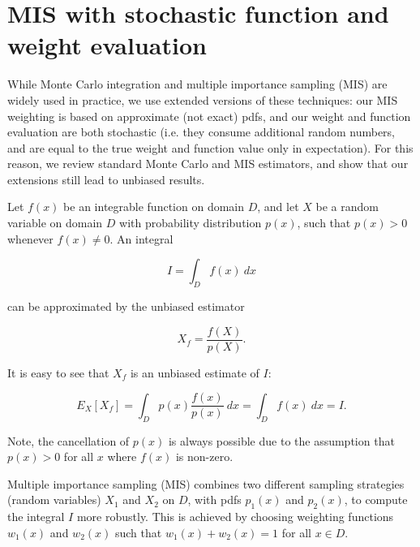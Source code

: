 \section{MIS with stochastic function and weight evaluation}
\label{sec:weight_computation}


While Monte	Carlo integration and multiple importance sampling (MIS) are widely used in practice, we use extended versions of these techniques: our MIS weighting is based on approximate (not exact) pdfs, and our weight and function evaluation are both stochastic (i.e. they consume additional random numbers, and are  equal to the true weight and function value only in expectation). For this reason, we review standard Monte Carlo and MIS estimators, and show that our extensions still lead to unbiased results.



Let $f(x)$ be an integrable function on domain $D$, and let $X$ be a random variable on domain $D$ with probability distribution $p(x)$, such that $p(x) > 0$ whenever $f(x) \neq 0$. An integral

\begin{equation}
I = \int_D f(x) \ dx
\end{equation}

can be approximated by the unbiased estimator

\begin{equation}
X_f = \frac{f(X)}{p(X)}.
\end{equation}

It is easy to see that $X_f$ is an unbiased estimate of $I$:

\begin{equation}
E_X[X_f] = \int_D p(x) \frac{f(x)}{p(x)} \ dx = \int_D f(x) \ dx = I.
\end{equation}

Note, the cancellation of $p(x)$ is always possible due to the assumption that $p(x) > 0$ for all $x$ where $f(x)$ is non-zero.



Multiple importance sampling (MIS) combines two different sampling strategies (random variables) $X_1$ and $X_2$ on $D$, with pdfs $p_1(x)$ and $p_2(x)$, to compute the integral $I$ more robustly. This is achieved by choosing weighting functions $w_1(x)$ and $w_2(x)$ such that $w_1(x) + w_2(x) = 1$ for all $x \in D$.

